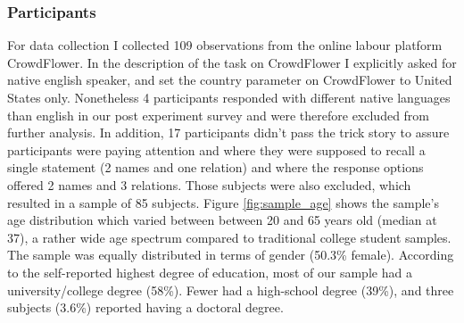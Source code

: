 \documentclass[a4paper,man,natbib,floatsintext,import]{apa6}
\begin{document}
\subsubsection{Participants}
For data collection I collected 109 observations from the online labour platform CrowdFlower. In the description of the task on CrowdFlower I explicitly asked for native english speaker, and set the country parameter on CrowdFlower to United States only. Nonetheless 4 participants responded with different native languages than english in our post experiment survey and were therefore excluded from further analysis. In addition, 17 participants didn't pass the trick story to assure participants were paying attention and where they were supposed to recall a single statement (2 names and one relation) and where the response options offered 2 names and 3 relations. Those subjects were also excluded, which resulted in a sample of 85 subjects. Figure \ref{fig:sample_age} shows the sample's age distribution which varied between between 20 and 65 years old (median at 37), a rather wide age spectrum compared to traditional college student samples. The sample was equally distributed in terms of gender (50.3\% female). According to the self-reported highest degree of education, most of our sample had a university/college degree (58\%). Fewer had a high-school degree (39\%), and three subjects (3.6\%) reported having a doctoral degree.
\end{document}

